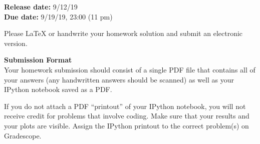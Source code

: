 

\def\title{Homework 2}

\newcommand{\qitem}{\qpart\item}

\renewcommand{\labelenumi}{(\alph{enumi})} %
\renewcommand{\theenumi}{(\alph{enumi})} %
\renewcommand{\labelenumii}{\roman{enumii}.} %
\renewcommand{\theenumii}{\roman{enumii}.}

\maketitle






\noindent
{\bf Release date:}  9/12/19 \\
{\bf Due date:}  9/19/19, 23:00 (11 pm)

Please \LaTeX{} or handwrite your homework solution and submit an electronic version.

\textbf{Submission Format} \\
Your homework submission should consist of a single PDF file that contains all of your answers (any handwritten answers should be scanned) as well as your IPython notebook saved as a PDF.
			
If you do not attach a PDF ``printout'' of your IPython notebook, you will not receive credit for problems that involve coding. Make sure that your results and your plots are visible. Assign the IPython printout to the correct problem(s) on Gradescope.
			

